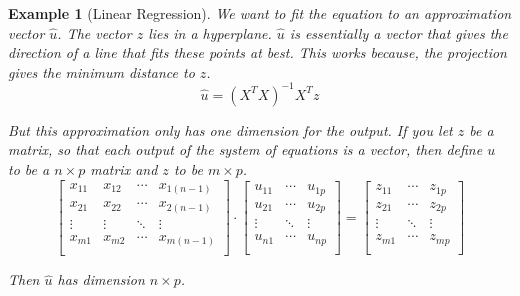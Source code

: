 \documentclass{book}
\newtheorem{example}{Example}[chapter]
\begin{document}
\begin{example}[Linear Regression]
    We want to fit the equation to an approximation vector $\hat u$. The vector $z$
    lies in a hyperplane. $\hat u$ is essentially a vector that gives the direction
    of a line that fits these points at best. This works because, the projection
    gives the minimum distance to $z$.
    \begin{equation}
        \hat u = {\left(X^{T}X\right)}^{-1}X^{T}z
    \end{equation}

    But this approximation only has one dimension for the output. If you let $z$ be
    a matrix, so that each output of the system of equations is a vector, then
    define $u$ to be a $n\times p$ matrix and $z$ to be $m\times p$.
    \begin{equation}
        \left[
            \begin{matrix}
                x_{11} & x_{12} & \cdots & x_{1(n-1)} \\
                x_{21} & x_{22} & \cdots & x_{2(n-1)} \\
                \vdots & \vdots & \ddots & \vdots     \\
                x_{m1} & x_{m2} & \cdots & x_{m(n-1)} \\
            \end{matrix}
            \right]\cdot \left[
            \begin{matrix}
                u_{11} & \cdots & u_{1p} \\
                u_{21} & \cdots & u_{2p} \\
                \vdots & \ddots & \vdots \\
                u_{n1} & \cdots & u_{np} \\
            \end{matrix}
            \right] = \left[
            \begin{matrix}
                z_{11} & \cdots & z_{1p} \\
                z_{21} & \cdots & z_{2p} \\
                \vdots & \ddots & \vdots \\
                z_{m1} & \cdots & z_{mp} \\
            \end{matrix}
            \right]
    \end{equation}

    Then $\hat u$ has dimension $n\times p$. 


\end{example}
\end{document}
